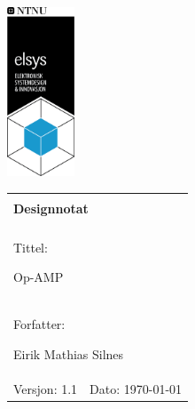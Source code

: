 \begin{minipage}[c]{0.15\textwidth}
\includegraphics[width=2.0cm]{Bilder/elsys_pos_staaende_ntnu.png}  
\end{minipage}
\begin{minipage}[c]{0.85\textwidth}

\renewcommand{\arraystretch}{1.7}
\large 
\begin{tabularx}{\textwidth}{|X|X|}
\hline
\multicolumn{2}{|l|}{} \\
\multicolumn{2}{|l|}{\huge \textbf{Designnotat}} \\
\multicolumn{2}{|l|}{}  \\
\hline
\multicolumn{2}{|l|}{Tittel: 

Op-AMP 
} \\
\hline
\multicolumn{2}{|l|}{Forfatter: 

Eirik Mathias Silnes
} \\
\hline

Versjon: 1.1 & Dato: \today
\\
\hline 
\end{tabularx}
\end{minipage}
\normalsize